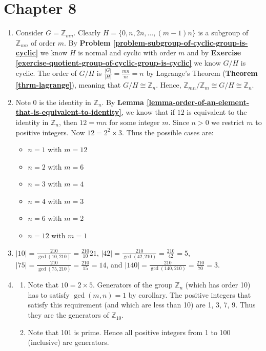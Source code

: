 \section*{Chapter 8}
\begin{enumerate}
    \item Consider $G = \mathbb{Z}_{mn}$. Clearly $H = \{0, n, 2n, \dots, (m-1)n\}$ is a subgroup of $\mathbb{Z}_{mn}$ of order $m$. By \textbf{Problem \ref{problem-subgroup-of-cyclic-group-is-cyclic}} we know $H$ is normal and cyclic with order $m$ and by \textbf{Exercise \ref{exercise-quotient-group-of-cyclic-group-is-cyclic}} we know $G/H$ is cyclic. The order of $G/H$ is $\frac{|G|}{|H|} = \frac{mn}{m} = n$ by Lagrange's Theorem (\textbf{Theorem \ref{thrm-lagrange}}), meaning that $G/H \cong \mathbb{Z}_n$. Hence, $\mathbb{Z}_{mn}/\mathbb{Z}_m \cong G/H \cong \mathbb{Z}_n$.
    
    \item Note 0 is the identity in $\mathbb{Z}_n$. By \textbf{Lemma \ref{lemma-order-of-an-element-that-is-equivalent-to-identity}}, we know that if $12$ is equivalent to the identity in $\mathbb{Z}_n$, then $12 = mn$ for some integer $m$. Since $n > 0$ we restrict $m$ to positive integers. Now $12 = 2^2 \times 3$. Thus the possible cases are:
    \begin{itemize}
        \item $n = 1$ with $m = 12$
        \item $n = 2$ with $m = 6$
        \item $n = 3$ with $m = 4$
        \item $n = 4$ with $m = 3$
        \item $n = 6$ with $m = 2$
        \item $n = 12$ with $m = 1$
    \end{itemize}

    \item $|10| = \frac{210}{\gcd(10, 210)} = \frac{210}{10} 21$, $|42| = \frac{210}{\gcd(42, 210)} = \frac{210}{42} = 5$, $|75| = \frac{210}{\gcd(75, 210)} = \frac{210}{15} = 14$, and $|140| = \frac{210}{\gcd(140, 210)} = \frac{210}{70} = 3$.

    \item \begin{enumerate}[label=(\alph*)]
        \item Note that $10 = 2 \times 5$. Generators of the group $\mathbb{Z}_n$ (which has order 10) has to satisfy $\gcd(m,n) = 1$ by corollary. The positive integers that satisfy this requirement (and which are less than 10) are 1, 3, 7, 9. Thus they are the generators of $\mathbb{Z}_10$.
        \item Note that 101 is prime. Hence all positive integers from 1 to 100 (inclusive) are generators.
    \end{enumerate}


\end{enumerate}
